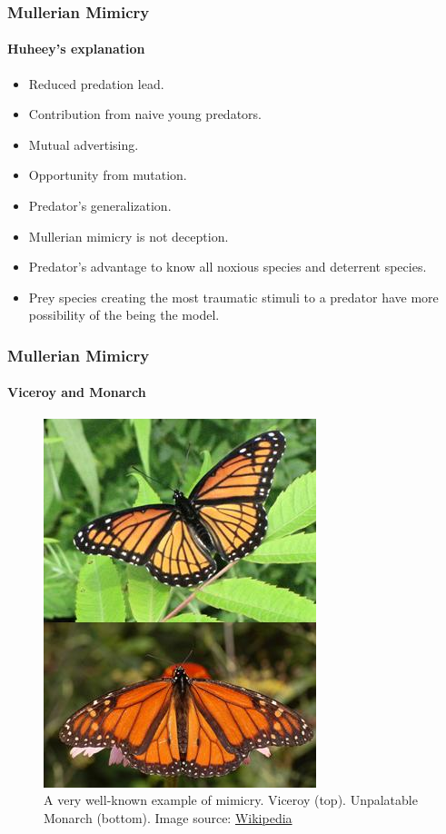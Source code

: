 \frame
{
	\frametitle{Mullerian Mimicry}
	\framesubtitle{Huheey's explanation}
	
	\begin{itemize}
		\item Reduced predation lead.
		\item Contribution from naive young predators.
		\item Mutual advertising.
		\item Opportunity from mutation.
		\item Predator's generalization.
	\end{itemize}
	
	\begin{itemize}
		\item Mullerian mimicry is not deception.
		\item Predator's advantage to know all noxious species and deterrent species.
		\item Prey species creating the most traumatic stimuli to a predator have more possibility of the being the model.
	\end{itemize}
}

\frame
{
	\frametitle{Mullerian Mimicry}
	\framesubtitle{Viceroy and Monarch}

	\begin{figure}[H]
		\centering
		\includegraphics[scale=0.5]{../tex/images/BatesMimButter}
		\caption{A very well-known example of mimicry. Viceroy (top). Unpalatable Monarch (bottom). Image source: \href{http://en.wikipedia.org/wiki/Mullerian_mimicry}{Wikipedia}}
		\label{fig:mullerian-butterfly}
	\end{figure}

}

